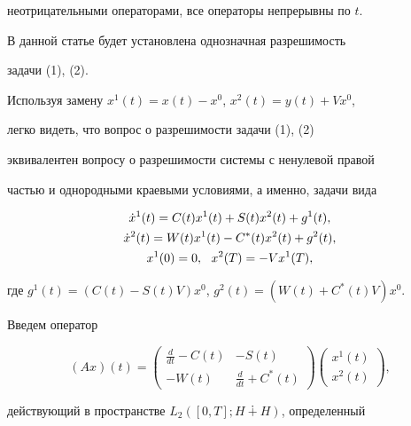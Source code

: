 неотрицательными операторами, все операторы непрерывны по $t$.





В данной статье будет установлена однозначная разрешимость


задачи (1), (2).





Используя замену $x^{1}(t)=x(t)-x^{0}$, $x^{2}(t)=y(t)+Vx^{0}$,


легко видеть, что вопрос о разрешимости задачи (1), (2)


эквивалентен вопросу о разрешимости системы с ненулевой правой


частью и однородными краевыми условиями, а именно, задачи вида


\begin{gather}


\Dot x^1(t)=C(t)x^{1}(t)+S(t)x^{2}(t)+g^{1}(t),\notag\\


\Dot x^2(t)=W(t)x^{1}(t)-C^{*}(t)x^{2}(t)+g^{2}(t),\notag \\


x^{1}(0)=0,\ \ x^{2}(T)=-Vx^{1}(T),


\end{gather}


где $g^{1}(t)=(C(t)-S(t)V)x^{0}$, $g^{2}(t)=(W(t)+C^{*}(t)V)x^{0}$.





Введем оператор


\begin{equation}


(Ax)(t)=


\begin{pmatrix}


\frac{d}{dt}-C(t) & -S(t)\\ -W(t) & \frac{d}{dt}+C^{*}(t)


\end{pmatrix}


\begin{pmatrix}


x^{1}(t)\\ x^{2}(t)


\end{pmatrix}


,


\end{equation}


действующий в пространстве $L_{2}([0,T];H\dotplus H)$, определенный


